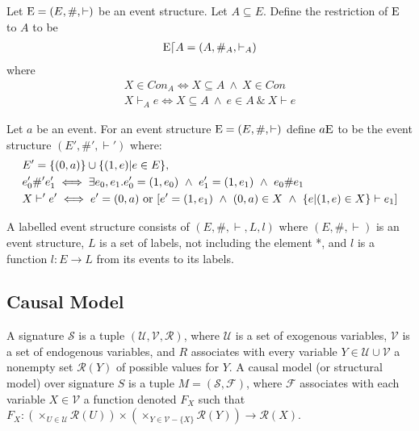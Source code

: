 \begin{definition}[Restriction]
    Let $\mathrm{E} = (E,\#,\vdash)$ be an event structure.
    Let $A \subseteq E$.
    Define the restriction of $\mathrm{E}$ to $A$ to be
    \begin{align*}
        \mathrm{E} \lceil A = (A,\#_A,\vdash_A)
    \end{align*}
    where
    \begin{align*}
        X \in Con_A \iff X \subseteq A \ \wedge \ X \in Con \\
        X \vdash_A e \iff X \subseteq A \ \wedge \ e \in A \ \& \ X \vdash e
    \end{align*}
\end{definition}

\begin{definition}
    Let $a$ be an event.
    For an event structure $\mathrm{E} = (E,\#,\vdash)$ define $a\mathrm{E}$ to be the event structure $(E',\#',\vdash')$ where:
    \begin{align*}
         & E' = \s{(0,a)} \cup \s{(1,e)|e \in E},                                                                               \\
         & e_0' \#' e_1'  \iff \exists e_0,e_1.e_0' = (1,e_0)
        \ \wedge \ e_1' = (1,e_1) \ \wedge \ e_0 \# e_1                                                                         \\
         & X \vdash' e' \iff e' = (0,a) \text{ or } [e' = (1,e_1) \ \wedge \ (0,a)\in X \ \wedge \ \s{e|(1,e)\in X} \vdash e_1]
    \end{align*}
\end{definition}

\begin{definition}
    A labelled event structure consists of $(E,\#,\vdash,L,l)$ where
    $(E,\#,\vdash)$ is an event structure, $L$ is a set of labels,
    not including the element *, and $l$ is a function $l: E \rightarrow L$
    from its events to its labels.
\end{definition}
\subsection{Causal Model \cite{hp}}

A signature $\mathcal{S}$ is a tuple $(\mathcal{U},\mathcal{V},\mathcal{R})$,
where $\mathcal{U}$ is a set of exogenous variables, $\mathcal{V}$
is a set of endogenous variables, and $R$ associates with every variable
$Y\in \mathcal{U}\cup \mathcal{V}$ a nonempty set $\mathcal{R}(Y)$ of possible values for $Y$.
A causal model (or structural model) over signature $S$ is a tuple
$M=(\mathcal{S},\mathcal{F})$, where $\mathcal{F}$ associates with
each variable $X \in \mathcal{V}$ a function denoted $F_X$ such that
$F_X: (\times_{U\in \mathcal{U}}\mathcal{R}(U))\times (\times_{Y\in\mathcal{V}-\{X\}}\mathcal{R}(Y))\rightarrow \mathcal{R}(X)$.

